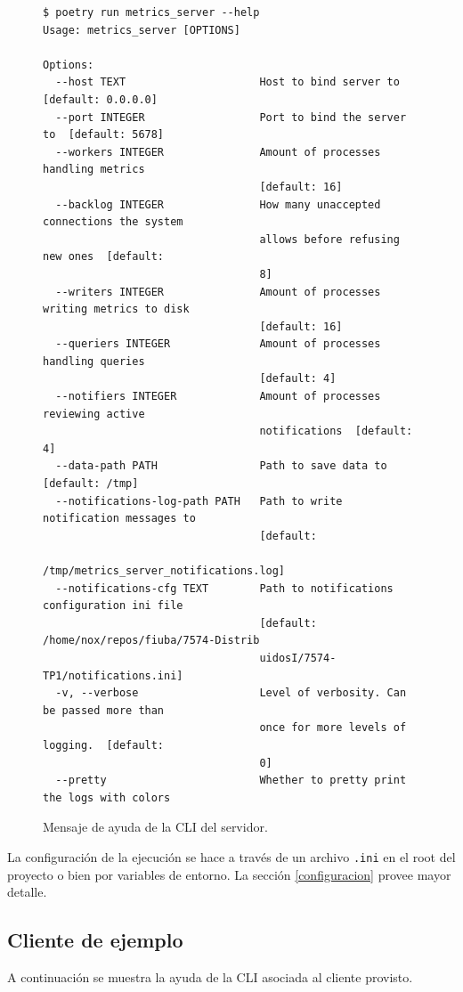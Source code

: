 \documentclass[a4paper,oneside]{article}
\begin{document}
\begin{figure}[H]
\begin{verbatim}
$ poetry run metrics_server --help
Usage: metrics_server [OPTIONS]

Options:
  --host TEXT                     Host to bind server to  [default: 0.0.0.0]
  --port INTEGER                  Port to bind the server to  [default: 5678]
  --workers INTEGER               Amount of processes handling metrics
                                  [default: 16]
  --backlog INTEGER               How many unaccepted connections the system
                                  allows before refusing new ones  [default:
                                  8]
  --writers INTEGER               Amount of processes writing metrics to disk
                                  [default: 16]
  --queriers INTEGER              Amount of processes handling queries
                                  [default: 4]
  --notifiers INTEGER             Amount of processes reviewing active
                                  notifications  [default: 4]
  --data-path PATH                Path to save data to  [default: /tmp]
  --notifications-log-path PATH   Path to write notification messages to
                                  [default:
                                  /tmp/metrics_server_notifications.log]
  --notifications-cfg TEXT        Path to notifications configuration ini file
                                  [default: /home/nox/repos/fiuba/7574-Distrib
                                  uidosI/7574-TP1/notifications.ini]
  -v, --verbose                   Level of verbosity. Can be passed more than
                                  once for more levels of logging.  [default:
                                  0]
  --pretty                        Whether to pretty print the logs with colors
\end{verbatim}
\caption{Mensaje de ayuda de la CLI del servidor.}
\end{figure}

La configuración de la ejecución se hace a través de un archivo \texttt{.ini} en el root del proyecto o bien por variables de entorno. La sección \ref{configuracion} provee mayor detalle.

\subsection{Cliente de ejemplo}
A continuación se muestra la ayuda de la CLI asociada al cliente provisto.
\end{document}
